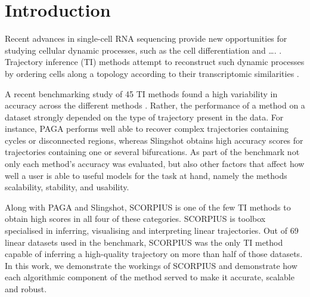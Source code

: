 \section{Introduction}
Recent advances in single-cell RNA sequencing provide new opportunities for studying cellular dynamic processes, such as the cell differentiation and \ldots. \cite{tanay_scalingsinglecellgenomics_2017,etzrodt_quantitativesinglecellapproaches_2014}.
Trajectory inference (TI) methods attempt to reconstruct such dynamic processes by ordering cells along a topology according to their transcriptomic similarities \cite{tanay_scalingsinglecellgenomics_2017,cannoodt_computationalmethodstrajectory_2016}. 

A recent benchmarking study of 45 TI methods found a high variability in accuracy across the different methods \cite{saelens_comparisonsinglecelltrajectory_2019}. Rather, the performance of a method on a dataset strongly depended on the type of trajectory present in the data. For instance, PAGA \cite{wolf_pagagraphabstraction_2019} performs well able to recover complex trajectories containing cycles or disconnected regions, whereas Slingshot \cite{street_slingshotcelllineage_2018} obtains high accuracy scores for trajectories containing one or several bifurcations. As part of the benchmark not only each method's accuracy was evaluated, but also other factors that affect how well a user is able to useful models for the task at hand, namely the methods scalability, stability, and usability.

Along with PAGA and Slingshot, SCORPIUS is one of the few TI methods to obtain high scores in all four of these categories. SCORPIUS is toolbox specialised in inferring, visualising and interpreting linear trajectories. Out of 69 linear datasets used in the benchmark, SCORPIUS was the only TI method capable of inferring a high-quality trajectory on more than half of those datasets. In this work, we demonstrate the workings of SCORPIUS and demonstrate how each algorithmic component of the method served to make it accurate, scalable and robust.



